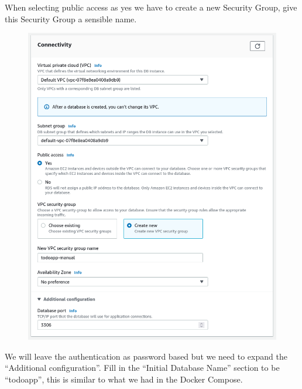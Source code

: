 \documentclass{csse4400}
\begin{document}
When selecting public access as yes we have to create a new Security Group,
give this Security Group a sensible name.

\begin{figure}[H]
  \includegraphics[width=\textwidth]{images/db6}
\end{figure}

We will leave the authentication as password based but we need to expand the ``Additional configuration''.
Fill in the ``Initial Database Name'' section to be ``todoapp'',
this is similar to what we had in the Docker Compose.

\end{document}
